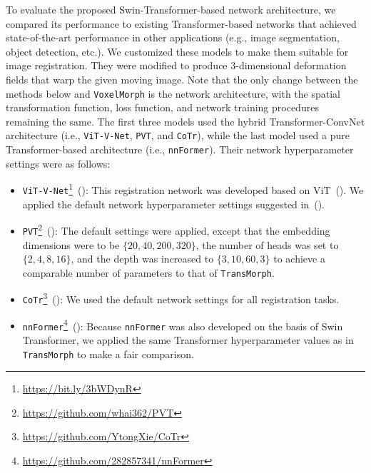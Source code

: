 \documentclass[times,twocolumn,final]{elsarticle}
\begin{document}
To evaluate the proposed Swin-Transformer-based network architecture, we compared its performance to existing Transformer-based networks that achieved state-of-the-art performance in other applications (e.g., image segmentation, object detection, etc.). We customized these models to make them suitable for image registration. They were modified to produce 3-dimensional deformation fields that warp the given moving image. Note that the only change between the methods below and \texttt{VoxelMorph} is the network architecture, with the spatial transformation function, loss function, and network training procedures remaining the same. The first three models used the hybrid Transformer-ConvNet architecture (i.e., \texttt{ViT-V-Net}, \texttt{PVT}, and \texttt{CoTr}), while the last model used a pure Transformer-based architecture (i.e., \texttt{nnFormer}). Their network hyperparameter settings were as follows:
\begin{itemize}[noitemsep]
    \item \texttt{ViT-V-Net}\footnote{\url{ https://bit.ly/3bWDynR}}~(\cite{chen2021vit}): This registration network was developed based on ViT~(\cite{dosovitskiy2020image}). We applied the default network hyperparameter settings suggested in~(\cite{chen2021vit}).
    \item \texttt{PVT}\footnote{\url{https://github.com/whai362/PVT}}~(\cite{wang2021pyramid}): The default settings were applied, except that the embedding dimensions were to be $\{20, 40, 200, 320\}$, the number of heads was set to $\{2, 4, 8, 16\}$, and the depth was increased to $\{3, 10, 60, 3\}$ to achieve a comparable number of parameters to that of \texttt{TransMorph}.
    \item \texttt{CoTr}\footnote{\url{https://github.com/YtongXie/CoTr}}~(\cite{xie2021cotr}): We used the default network settings for all registration tasks.
    \item \texttt{nnFormer}\footnote{\url{https://github.com/282857341/nnFormer}}~(\cite{zhou2021nnformer}): Because \texttt{nnFormer} was also developed on the basis of Swin Transformer, we applied the same Transformer hyperparameter values as in \texttt{TransMorph} to make a fair comparison.
\end{itemize}
\end{document}
